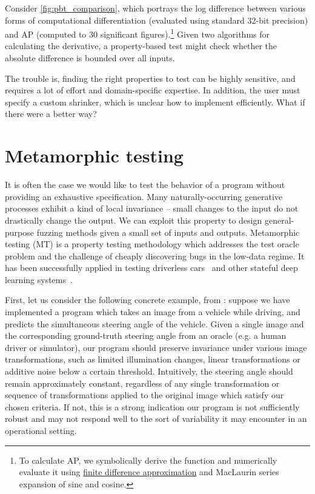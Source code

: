%
Consider \autoref{fig:pbt_comparison}, which portrays the log difference between various forms of computational differentiation (evaluated using standard 32-bit precision) and AP (computed to 30 significant figures).\hspace{-.08em}\footnote{To calculate AP, we symbolically derive the function and numerically evaluate it using \hyperref[sec:fdm]{finite difference approximation} and MacLaurin series expansion of sine and cosine.} Given two algorithms for calculating the derivative, a property-based test might check whether the absolute difference is bounded over all inputs.

The trouble is, finding the right properties to test can be highly sensitive, and requires a lot of effort and domain-specific expertise. In addition, the user must specify a custom shrinker, which is unclear how to implement efficiently. What if there were a better way?

\section{Metamorphic testing}\label{subsec:metamorphic-testing}

It is often the case we would like to test the behavior of a program without providing an exhaustive specification. Many naturally-occurring generative processes exhibit a kind of local invariance -- small changes to the input do not drastically change the output. We can exploit this property to design general-purpose fuzzing methods given a small set of inputs and outputs. Metamorphic testing (MT) is a property testing methodology which addresses the test oracle problem and the challenge of cheaply discovering bugs in the low-data regime. It has been successfully applied in testing driverless cars~\citep{zhou2019metamorphic, pei2017deepxplore, tian2018deeptest} and other stateful deep learning systems~\citep{du2018deepcruiser}.

First, let us consider the following concrete example, from \citet{tian2018deeptest}: suppose we have implemented a program which takes an image from a vehicle while driving, and predicts the simultaneous steering angle of the vehicle. Given a single image and the corresponding ground-truth steering angle from an oracle (e.g. a human driver or simulator), our program should preserve invariance under various image transformations, such as limited illumination changes, linear transformations or additive noise below a certain threshold. Intuitively, the steering angle should remain approximately constant, regardless of any single transformation or sequence of transformations applied to the original image which satisfy our chosen criteria. If not, this is a strong indication our program is not sufficiently robust and may not respond well to the sort of variability it may encounter in an operational setting.

